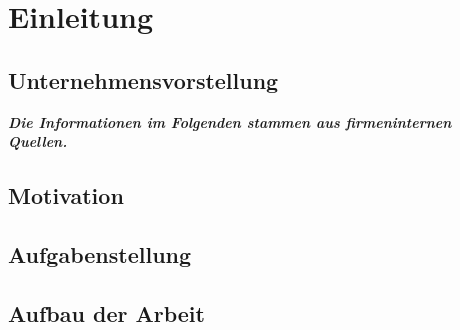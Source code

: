 \chapter{Einleitung}\label{chap:Einleitung}
\setcounter{page}{1}
\blindtext

\section{Unternehmensvorstellung}\label{sec:1_Firma}

\textit{\textbf{Die Informationen im Folgenden stammen aus firmeninternen Quellen.}}\\

\blindtext

\blindtext

\newpage

\section{Motivation}\label{sec:1_Motivation}

\blindtext

\blindtext

\blindtext

\newpage
\section{Aufgabenstellung}\label{sec:1_Aufgabenstellung}

\blindtext

\newpage
\section{Aufbau der Arbeit}\label{sec:1_AufbauArbeit}

\blindtext

\newpage
